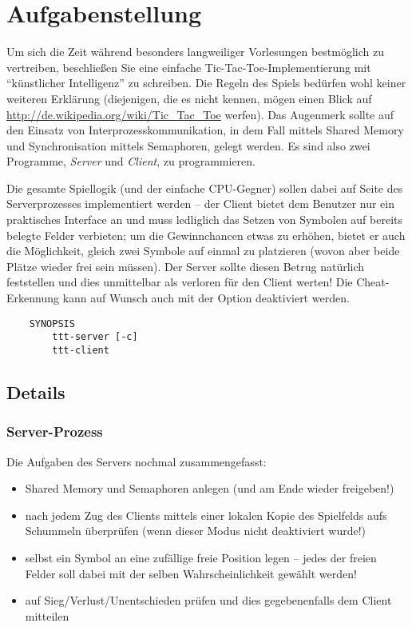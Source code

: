 




\section*{Aufgabenstellung}

Um sich die Zeit während besonders langweiliger Vorlesungen bestmöglich
zu vertreiben, beschließen Sie eine einfache Tic-Tac-Toe-Implementierung
mit "`künstlicher Intelligenz"' zu schreiben. Die Regeln des Spiels bedürfen
wohl keiner weiteren Erklärung (diejenigen, die es nicht kennen, mögen einen
Blick auf \url{http://de.wikipedia.org/wiki/Tic_Tac_Toe} werfen). Das Augenmerk
sollte auf den Einsatz von Interprozesskommunikation, in dem Fall
mittels Shared Memory und Synchronisation mittels Semaphoren, gelegt werden.
Es sind also zwei Programme, \textit{Server} und \textit{Client}, zu
programmieren.

Die gesamte Spiellogik (und der einfache CPU-Gegner) sollen dabei auf Seite des
Serverprozesses implementiert werden -- der Client bietet dem Benutzer nur
ein praktisches Interface an und muss ledliglich das Setzen von Symbolen auf
bereits belegte Felder verbieten; um die Gewinnchancen etwas zu erhöhen, bietet
er auch die Möglichkeit, gleich zwei Symbole auf einmal zu platzieren (wovon
aber beide Plätze wieder frei sein müssen). Der Server sollte diesen Betrug
natürlich feststellen und dies unmittelbar als verloren für den Client werten!
Die Cheat-Erkennung kann auf Wunsch auch mit der Option  deaktiviert
werden.

\begin{verbatim}
    SYNOPSIS
        ttt-server [-c]
        ttt-client
\end{verbatim}

\subsection*{Details}
\subsubsection*{Server-Prozess}

Die Aufgaben des Servers nochmal zusammengefasst:

\begin{itemize}
\item Shared Memory und Semaphoren anlegen (und am Ende wieder freigeben!)
\item nach jedem Zug des Clients mittels einer lokalen Kopie des Spielfelds aufs
  Schummeln überprüfen (wenn dieser Modus nicht deaktiviert wurde!)
\item selbst ein Symbol an eine zufällige freie Position legen -- jedes der
  freien Felder soll dabei mit der selben Wahrscheinlichkeit gewählt werden!
\item auf Sieg/Verlust/Unentschieden prüfen und dies gegebenenfalls dem Client
  mitteilen
\end{itemize}

